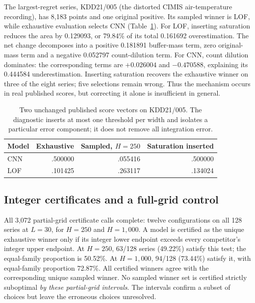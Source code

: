 The largest-regret series, KDD21/005 (the distorted CIMIS air-temperature
recording), has 8,183 points and one original positive. Its sampled winner
is LOF, while exhaustive evaluation selects CNN
(Table~\ref{tab:real-mechanism}). For LOF, inserting saturation reduces the
area by 0.129093, or 79.84\% of its total 0.161692 overestimation.
The net change decomposes into a positive 0.181891 buffer-mass term,
zero original-mass term and a negative 0.052797 count-dilution term.
For CNN, count dilution dominates: the corresponding terms are
$+0.026004$ and $-0.470588$, explaining its 0.444584 underestimation.
Inserting saturation recovers the exhaustive winner on three of the eight
series; five selections remain wrong. Thus the mechanism occurs in real
published scores, but correcting it alone is insufficient in general.

\begin{table}[t]
\caption{Two unchanged published score vectors on KDD21/005. The diagnostic
inserts at most one threshold per width and isolates a particular error
component; it does not remove all integration error.}
\label{tab:real-mechanism}

\centering\small
\begin{tabular}{lrrr}
\toprule
Model & Exhaustive & Sampled, $H=250$ & Saturation inserted\\
\midrule
CNN & .500000 & .055416 & .500000\\
LOF & .101425 & .263117 & .134024\\
\bottomrule
\end{tabular}

\end{table}

\subsection{Integer certificates and a full-grid control}
All 3,072 partial-grid certificate calls complete: twelve configurations
on all 128 series at $L=30$, for $H=250$ and $H=1,000$. A model is certified
as the unique exhaustive winner only if its integer lower endpoint exceeds
every competitor's integer upper endpoint. At $H=250$, 63/128 series
(49.22\%) satisfy this test; the equal-family proportion is 50.52\%.
At $H=1,000$, 94/128 (73.44\%) satisfy it, with equal-family proportion
72.87\%. All certified winners agree with the corresponding unique
sampled winner. No sampled winner set is certified strictly suboptimal
\emph{by these partial-grid intervals}. The intervals confirm a subset
of choices but leave the erroneous choices unresolved.

